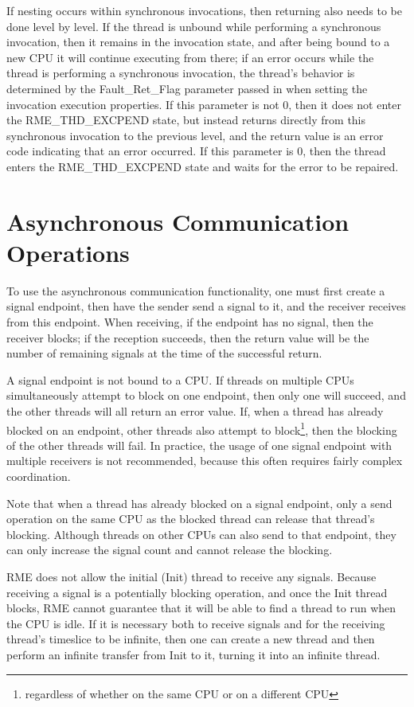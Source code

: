 If nesting occurs within synchronous invocations, then returning also needs to be done level by level. If the thread is unbound while performing a synchronous invocation, then it remains in the invocation state, and after being bound to a new CPU it will continue executing from there; if an error occurs while the thread is performing a synchronous invocation, the thread's behavior is determined by the Fault\_Ret\_Flag parameter passed in when setting the invocation execution properties. If this parameter is not 0, then it does not enter the RME\_THD\_EXCPEND state, but instead returns directly from this synchronous invocation to the previous level, and the return value is an error code indicating that an error occurred. If this parameter is 0, then the thread enters the RME\_THD\_EXCPEND state and waits for the error to be repaired.

\section{Asynchronous Communication Operations}\label{sec:5-async-communication-operations}

To use the asynchronous communication functionality, one must first create a signal endpoint, then have the sender send a signal to it, and the receiver receives from this endpoint. When receiving, if the endpoint has no signal, then the receiver blocks; if the reception succeeds, then the return value will be the number of remaining signals at the time of the successful return.

A signal endpoint is not bound to a CPU. If threads on multiple CPUs simultaneously attempt to block on one endpoint, then only one will succeed, and the other threads will all return an error value. If, when a thread has already blocked on an endpoint, other threads also attempt to block\footnote{regardless of whether on the same CPU or on a different CPU}, then the blocking of the other threads will fail. In practice, the usage of one signal endpoint with multiple receivers is not recommended, because this often requires fairly complex coordination.

Note that when a thread has already blocked on a signal endpoint, only a send operation on the same CPU as the blocked thread can release that thread's blocking. Although threads on other CPUs can also send to that endpoint, they can only increase the signal count and cannot release the blocking.

RME does not allow the initial (Init) thread to receive any signals. Because receiving a signal is a potentially blocking operation, and once the Init thread blocks, RME cannot guarantee that it will be able to find a thread to run when the CPU is idle. If it is necessary both to receive signals and for the receiving thread's timeslice to be infinite, then one can create a new thread and then perform an infinite transfer from Init to it, turning it into an infinite thread.

